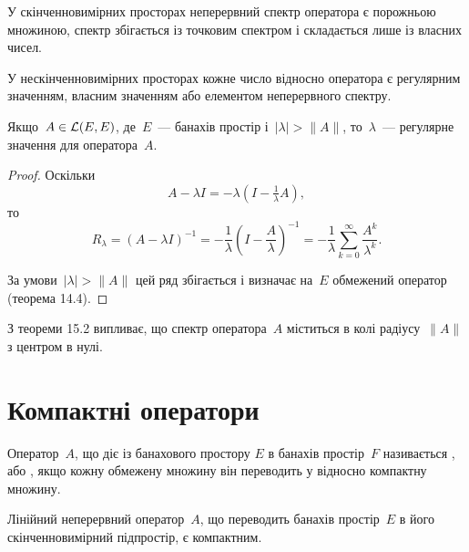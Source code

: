 \begin{remark}
У скінченновимірних просторах
неперервний спектр оператора є порожньою множиною,
спектр збігається із точковим спектром і складається
лише із власних чисел.

У нескінченновимірних просторах
кожне число відносно оператора є регулярним значенням,
власним значенням або елементом неперервного спектру.
\end{remark}

\begin{theorem}
Якщо~$A \in \mathcal{L}(E, E)$, де~$E$~--- банахів
простір і~$|\lambda| > \|A\|$, то~$\lambda$~--- регулярне значення для
оператора~$A$.
\end{theorem} 

\begin{proof}
Оскільки
\begin{equation*}
    A - \lambda I = - \lambda (I - \tfrac{1}{\lambda} A),
\end{equation*}
то
\begin{equation*}
    R_\lambda = (A - \lambda I)^{-1} =
    -\frac{1}{\lambda} \left( I - \frac{A}{\lambda} \right)^{-1} =
    -\frac{1}{\lambda} \sum_{k = 0}^\infty \frac{A^k}{\lambda^k}.
\end{equation*}

За умови~$|\lambda| > \|A\|$ цей ряд збігається і визначає на~$E$
обмежений оператор (теорема 14.4). 
\end{proof}

\begin{remark}
З \error теореми 15.2 випливає, що спектр
оператора~$A$ міститься в колі радіусу~$\|A\|$ з центром в нулі.
\end{remark}

\section{Компактні оператори}

\begin{definition}
Оператор~$A$, що діє із банахового простору
$E$ в банахів простір~$F$ називається , або
, якщо кожну обмежену множину він
переводить у відносно компактну множину.
\end{definition}

\begin{example}
Лінійний неперервний оператор~$A$, що
переводить банахів простір~$E$ в його скінченновимірний
підпростір, є компактним.
\end{example}


